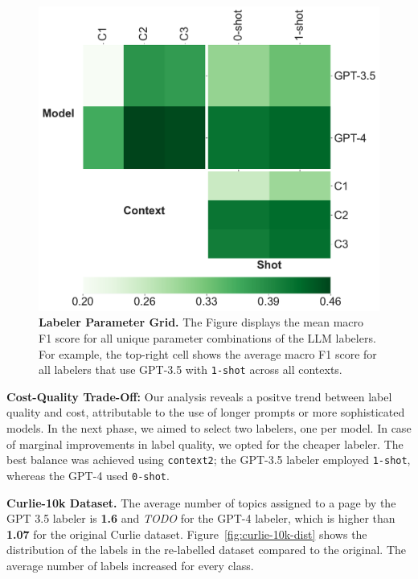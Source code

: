 \begin{figure}[!ht]
    \centering
    \includegraphics[width=.8\columnwidth]{figures/labeler-grid.pdf}
    \caption{\textbf{Labeler Parameter Grid.} The Figure displays the mean macro F1 score for all unique parameter combinations of the LLM labelers. For example, the top-right cell shows the average macro F1 score for all labelers that use GPT-3.5 with \texttt{1-shot} across all contexts.}
    \label{fig:labelers-grid}
\end{figure}

\textbf{Cost-Quality Trade-Off:} Our analysis reveals a positve trend between label quality and cost, attributable to the use of longer prompts or more sophisticated models. In the next phase, we aimed to select two labelers, one per model. In case of marginal improvements in label quality, we opted for the cheaper labeler. 
The best balance was achieved using \texttt{context2}; the GPT-3.5 labeler employed \texttt{1-shot}, whereas the GPT-4 used \texttt{0-shot}.

\textbf{Curlie-10k Dataset.} 
The average number of topics assigned to a page by the GPT 3.5 labeler is \textbf{1.6} and \textit{TODO} for the GPT-4 labeler, which is higher than \textbf{1.07} for the original Curlie dataset. Figure~\ref{fig:curlie-10k-dist} shows the distribution of the labels in the re-labelled dataset compared to the original. The average number of labels increased for every class.


